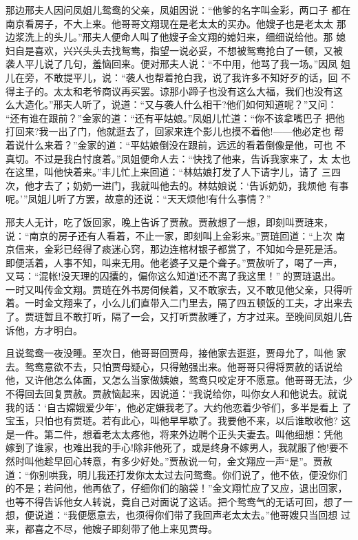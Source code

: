 那边邢夫人因问凤姐儿鸳鸯的父亲，凤姐因说：“他爹的名字叫金彩，两口子
都在南京看房子，不大上来。他哥哥文翔现在是老太太的买办。他嫂子也是老太太
那边浆洗上的头儿。”邢夫人便命人叫了他嫂子金文翔的媳妇来，细细说给他。那
媳妇自是喜欢，兴兴头头去找鸳鸯，指望一说必妥，不想被鸳鸯抢白了一顿，又被
袭人平儿说了几句，羞恼回来。便对邢夫人说：“不中用，他骂了我一场。”因凤
姐儿在旁，不敢提平儿，说：“袭人也帮着抢白我，说了我许多不知好歹的话，回
不得主子的。太太和老爷商议再买罢。谅那小蹄子也没有这么大福，我们也没有这
么大造化。”邢夫人听了，说道：“又与袭人什么相干?他们如何知道呢？”又问：
“还有谁在跟前？”金家的道：“还有平姑娘。”凤姐儿忙道：“你不该拿嘴巴子
把他打回来?我一出了门，他就逛去了，回家来连个影儿也摸不着他!——他必定也
帮着说什么来着？”金家的道：“平姑娘倒没在跟前，远远的看着倒像是他，可也
不真切。不过是我白忖度着。”凤姐便命人去：“快找了他来，告诉我家来了，太
太也在这里，叫他快着来。”丰儿忙上来回道：“林姑娘打发了人下请字儿，请了
三四次，他才去了；奶奶一进门，我就叫他去的。林姑娘说：‘告诉奶奶，我烦他
有事呢。’”凤姐儿听了方罢，故意的还说：“天天烦他!有什么事情？”

邢夫人无计，吃了饭回家，晚上告诉了贾赦。贾赦想了一想，即刻叫贾琏来，
说：“南京的房子还有人看着，不止一家，即刻叫上金彩来。”贾琏回道：“上次
南京信来，金彩已经得了痰迷心窍，那边连棺材银子都赏了，不知如今是死是活。
即便活着，人事不知，叫来无用。他老婆子又是个聋子。”贾赦听了，喝了一声，
又骂：“混帐!没天理的囚攮的，偏你这么知道!还不离了我这里！”的贾琏退出。
一时又叫传金文翔。贾琏在外书房伺候着，又不敢家去，又不敢见他父亲，只得听
着。一时金文翔来了，小么儿们直带入二门里去，隔了四五顿饭的工夫，才出来去
了。贾琏暂且不敢打听，隔了一会，又打听贾赦睡了，方才过来。至晚间凤姐儿告
诉他，方才明白。

且说鸳鸯一夜没睡。至次日，他哥哥回贾母，接他家去逛逛，贾母允了，叫他
家去。鸳鸯意欲不去，只怕贾母疑心，只得勉强出来。他哥哥只得将贾赦的话说给
他，又许他怎么体面，又怎么当家做姨娘，鸳鸯只咬定牙不愿意。他哥哥无法，少
不得回去回复贾赦。贾赦恼起来，因说道：“我说给你，叫你女人和他说去。就说
我的话：‘自古嫦娥爱少年’，他必定嫌我老了。大约他恋着少爷们，多半是看上
了宝玉，只怕也有贾琏。若有此心，叫他早早歇了。我要他不来，以后谁敢收他?
这是一件。第二件，想着老太太疼他，将来外边聘个正头夫妻去。叫他细想：凭他
嫁到了谁家，也难出我的手心!除非他死了，或是终身不嫁男人，我就服了他!要不
然时叫他趁早回心转意，有多少好处。”贾赦说一句，金文翔应一声“是”。贾赦
道：“你别哄我，明儿我还打发你太太过去问鸳鸯。你们说了，他不依，便没你们
的不是；若问他，他再依了，仔细你们的脑袋！”金文翔忙应了又应，退出回家，
也等不得告诉他女人转说，竟自己对面说了这话。把个鸳鸯气的无话可回，想了一
想，便说道：“我便愿意去，也须得你们带了我回声老太太去。”他哥嫂只当回想
过来，都喜之不尽，他嫂子即刻带了他上来见贾母。

